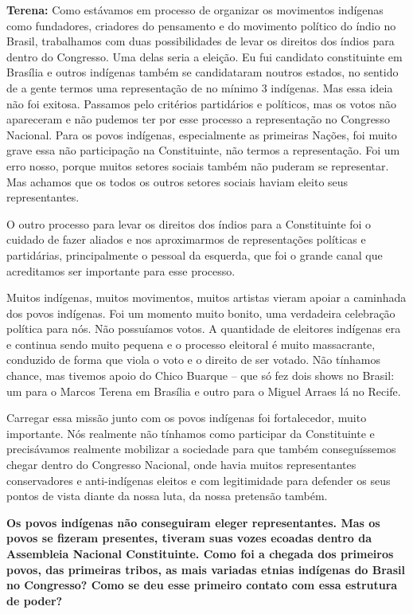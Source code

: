 \textbf{Terena:} Como estávamos em processo de organizar os movimentos
indígenas como fundadores, criadores do pensamento e do movimento
político do índio no Brasil, trabalhamos com duas possibilidades de
levar os direitos dos índios para dentro do Congresso. Uma delas seria a
eleição. Eu fui candidato constituinte em Brasília e outros indígenas
também se candidataram noutros estados, no sentido de a gente termos uma
representação de no mínimo 3 indígenas. Mas essa ideia não foi exitosa.
Passamos pelo critérios partidários e políticos, mas os votos não
apareceram e não pudemos ter por esse processo a representação no
Congresso Nacional. Para os povos indígenas, especialmente as primeiras
Nações, foi muito grave essa não participação na Constituinte, não
termos a representação. Foi um erro nosso, porque muitos setores sociais
também não puderam se representar. Mas achamos que os todos os outros
setores sociais haviam eleito seus representantes.

O outro processo para levar os direitos dos índios para a Constituinte
foi o cuidado de fazer aliados e nos aproximarmos de representações
políticas e partidárias, principalmente o pessoal da esquerda, que foi o
grande canal que acreditamos ser importante para esse processo.

Muitos indígenas, muitos movimentos, muitos artistas vieram apoiar a
caminhada dos povos indígenas. Foi um momento muito bonito, uma
verdadeira celebração política para nós. Não possuíamos votos. A
quantidade de eleitores indígenas era e continua sendo muito pequena e o
processo eleitoral é muito massacrante, conduzido de forma que viola o
voto e o direito de ser votado. Não tínhamos chance, mas tivemos apoio
do Chico Buarque -- que só fez dois shows no Brasil: um para o Marcos
Terena em Brasília e outro para o Miguel Arraes lá no Recife.

Carregar essa missão junto com os povos indígenas foi fortalecedor,
muito importante. Nós realmente não tínhamos como participar da
Constituinte e precisávamos realmente mobilizar a sociedade para que
também conseguíssemos chegar dentro do Congresso Nacional, onde havia
muitos representantes conservadores e anti-indígenas eleitos e com
legitimidade para defender os seus pontos de vista diante da nossa luta,
da nossa pretensão também.

\textbf{Os povos indígenas não conseguiram eleger representantes. Mas os
povos se fizeram presentes, tiveram suas vozes ecoadas dentro da
Assembleia Nacional Constituinte. Como foi a chegada dos primeiros
povos, das primeiras tribos, as mais variadas etnias indígenas do Brasil
no Congresso? Como se deu esse primeiro contato com essa estrutura de
poder?}

